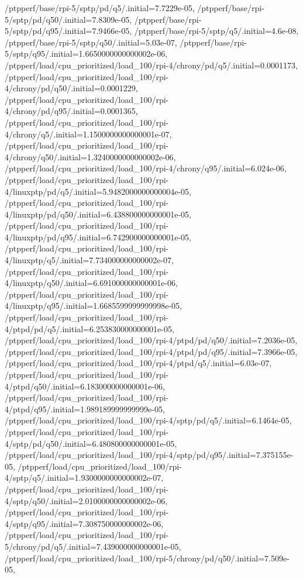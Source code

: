 {    /ptpperf/base/rpi-5/sptp/pd/q5/.initial=7.7229e-05,
    /ptpperf/base/rpi-5/sptp/pd/q50/.initial=7.8309e-05,
    /ptpperf/base/rpi-5/sptp/pd/q95/.initial=7.9466e-05,
    /ptpperf/base/rpi-5/sptp/q5/.initial=4.6e-08,
    /ptpperf/base/rpi-5/sptp/q50/.initial=5.03e-07,
    /ptpperf/base/rpi-5/sptp/q95/.initial=1.6650000000000002e-06,
    /ptpperf/load/cpu_prioritized/load_100/rpi-4/chrony/pd/q5/.initial=0.0001173,
    /ptpperf/load/cpu_prioritized/load_100/rpi-4/chrony/pd/q50/.initial=0.0001229,
    /ptpperf/load/cpu_prioritized/load_100/rpi-4/chrony/pd/q95/.initial=0.0001365,
    /ptpperf/load/cpu_prioritized/load_100/rpi-4/chrony/q5/.initial=1.1500000000000001e-07,
    /ptpperf/load/cpu_prioritized/load_100/rpi-4/chrony/q50/.initial=1.3240000000000002e-06,
    /ptpperf/load/cpu_prioritized/load_100/rpi-4/chrony/q95/.initial=6.024e-06,
    /ptpperf/load/cpu_prioritized/load_100/rpi-4/linuxptp/pd/q5/.initial=5.9482000000000004e-05,
    /ptpperf/load/cpu_prioritized/load_100/rpi-4/linuxptp/pd/q50/.initial=6.438800000000001e-05,
    /ptpperf/load/cpu_prioritized/load_100/rpi-4/linuxptp/pd/q95/.initial=6.742900000000001e-05,
    /ptpperf/load/cpu_prioritized/load_100/rpi-4/linuxptp/q5/.initial=7.734000000000002e-07,
    /ptpperf/load/cpu_prioritized/load_100/rpi-4/linuxptp/q50/.initial=6.691000000000001e-06,
    /ptpperf/load/cpu_prioritized/load_100/rpi-4/linuxptp/q95/.initial=1.6685599999999998e-05,
    /ptpperf/load/cpu_prioritized/load_100/rpi-4/ptpd/pd/q5/.initial=6.253830000000001e-05,
    /ptpperf/load/cpu_prioritized/load_100/rpi-4/ptpd/pd/q50/.initial=7.2036e-05,
    /ptpperf/load/cpu_prioritized/load_100/rpi-4/ptpd/pd/q95/.initial=7.3966e-05,
    /ptpperf/load/cpu_prioritized/load_100/rpi-4/ptpd/q5/.initial=6.03e-07,
    /ptpperf/load/cpu_prioritized/load_100/rpi-4/ptpd/q50/.initial=6.183000000000001e-06,
    /ptpperf/load/cpu_prioritized/load_100/rpi-4/ptpd/q95/.initial=1.989189999999999e-05,
    /ptpperf/load/cpu_prioritized/load_100/rpi-4/sptp/pd/q5/.initial=6.1464e-05,
    /ptpperf/load/cpu_prioritized/load_100/rpi-4/sptp/pd/q50/.initial=6.480800000000001e-05,
    /ptpperf/load/cpu_prioritized/load_100/rpi-4/sptp/pd/q95/.initial=7.375155e-05,
    /ptpperf/load/cpu_prioritized/load_100/rpi-4/sptp/q5/.initial=1.9300000000000002e-07,
    /ptpperf/load/cpu_prioritized/load_100/rpi-4/sptp/q50/.initial=2.0100000000000002e-06,
    /ptpperf/load/cpu_prioritized/load_100/rpi-4/sptp/q95/.initial=7.308750000000002e-06,
    /ptpperf/load/cpu_prioritized/load_100/rpi-5/chrony/pd/q5/.initial=7.439000000000001e-05,
    /ptpperf/load/cpu_prioritized/load_100/rpi-5/chrony/pd/q50/.initial=7.509e-05,
}
